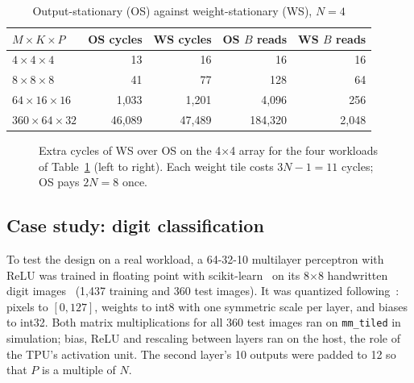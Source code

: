 \documentclass[conference]{IEEEtran}
\newcommand{\code}[1]{\texttt{#1}}
\begin{document}
\begin{table}[t]
\centering
\caption{Output-stationary (OS) against weight-stationary (WS), $N{=}4$}
\label{tab:osws}
\setlength{\tabcolsep}{4pt}
\begin{tabular}{lrrrr}
\toprule
$M{\times}K{\times}P$ & OS cycles & WS cycles & OS $B$ reads & WS $B$ reads \\
\midrule
$4{\times}4{\times}4$ & 13 & 16 & 16 & 16 \\
$8{\times}8{\times}8$ & 41 & 77 & 128 & 64 \\
$64{\times}16{\times}16$ & 1,033 & 1,201 & 4,096 & 256 \\
$360{\times}64{\times}32$ & 46,089 & 47,489 & 184,320 & 2,048 \\
\bottomrule
\end{tabular}
\end{table}

\begin{figure}[t]
\centering
{}
\caption{Extra cycles of WS over OS on the 4$\times$4 array for the four workloads of Table~\ref{tab:osws} (left to right). Each weight tile costs $3N - 1 = 11$ cycles; OS pays $2N = 8$ once.}
\label{fig:delta}
\end{figure}

\subsection{Case study: digit classification}
\label{sec:nn}
To test the design on a real workload, a 64-32-10 multilayer perceptron with ReLU was trained in floating point with scikit-learn~\cite{pedregosa2011} on its 8$\times$8 handwritten digit images~\cite{alpaydin1998} (1,437 training and 360 test images). It was quantized following~\cite{jacob2018}: pixels to $[0,127]$, weights to int8 with one symmetric scale per layer, and biases to int32. Both matrix multiplications for all 360 test images ran on \code{mm\_tiled} in simulation; bias, ReLU and rescaling between layers ran on the host, the role of the TPU's activation unit. The second layer's 10 outputs were padded to 12 so that $P$ is a multiple of $N$.
\end{document}
